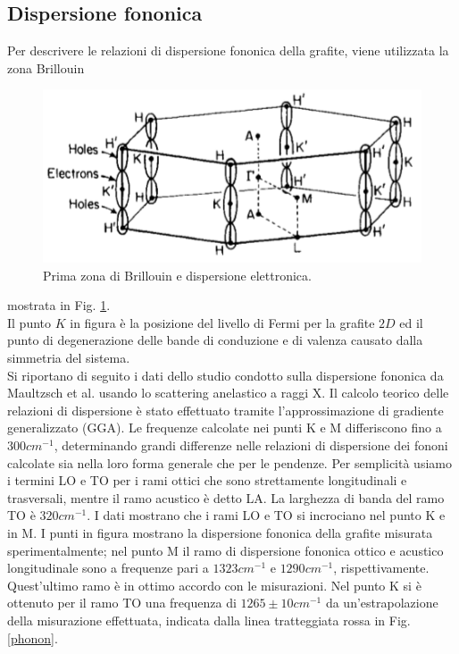 \documentclass[a4paper,titlepage]{book}
\begin{document}
\subsection{Dispersione fononica}
Per descrivere le relazioni di dispersione fononica della grafite, viene utilizzata la zona Brillouin 
\begin{figure}[h!] 
	\centering
	\includegraphics[width=0.6\columnwidth]{brillouingrafite.png}
	\caption{ 	\label{Br}
		Prima zona di Brillouin e dispersione elettronica.
	}
\end{figure}
mostrata in Fig. \ref{Br}. \\
Il punto $K$ in figura è la posizione del livello di Fermi per la grafite $2D$ ed il punto di degenerazione delle bande di conduzione e di valenza causato dalla simmetria del sistema. \\
Si  riportano di seguito i dati dello studio condotto sulla dispersione fononica da Maultzsch et al.\cite{Mault} usando lo scattering anelastico a raggi X.
Il calcolo teorico delle relazioni di dispersione è stato effettuato tramite l'approssimazione di gradiente generalizzato (GGA). Le frequenze calcolate nei punti K e M differiscono fino a $300 cm^{-1}$, determinando grandi differenze nelle relazioni di dispersione dei fononi calcolate sia nella loro forma generale che per le pendenze.
Per semplicità usiamo i termini LO e TO  per i rami ottici che sono strettamente longitudinali e trasversali, mentre il ramo acustico è detto LA.
La larghezza di banda del ramo TO è $320 cm^{- 1}$. I dati mostrano che i rami LO e TO si incrociano nel punto K e in M.
I punti in figura mostrano la dispersione fononica della grafite misurata sperimentalmente; nel punto M il ramo di dispersione fononica ottico e acustico longitudinale sono a frequenze pari a $1323 cm ^ {- 1}$ e $1290 cm ^ {- 1}$, rispettivamente. Quest'ultimo ramo è in ottimo accordo con le misurazioni. Nel punto K si è ottenuto per il ramo TO una frequenza di $1265 \pm 10 cm^{-1}$ da un'estrapolazione della misurazione effettuata, indicata dalla linea tratteggiata rossa in Fig. \ref{phonon}.
\end{document}
